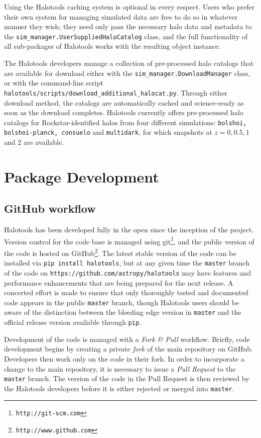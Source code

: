 \documentclass[usenatbib,usegraphicx,letterpaper]{mn2e}
\begin{document}
Using the Halotools caching system is optional in every respect. Users who prefer their own system for managing simulated data are free to do so in whatever manner they wish; they need only pass the necessary halo data and metadata to the {\tt sim\_manager.UserSuppliedHaloCatalog} class, and the full functionality of all sub-packages of Halotools works with the resulting object instance.  

The Halotools developers manage a collection of pre-processed halo catalogs that are available for download either with the {\tt sim\_manager.DownloadManager} class, or with the command-line script {\tt halotools/scripts/download\_additional\_halocat.py}. Through either download method, the catalogs are automatically cached and science-ready as soon as the download completes. Halotools currently offers pre-processed halo catalogs for Rockstar-identified halos from four different simulations: {\tt bolshoi, bolshoi-planck, consuelo} and {\tt multidark}, for which snapshots at $z=0, 0.5, 1$ and $2$ are available.


\section{Package Development}
\label{section:development}

\subsection{GitHub workflow}
\label{subsection:githubworkflow}

Halotools has been developed fully in the open since the inception of the project. Version control for the code base is managed using git\footnote{\tt http://git-scm.com}, and the public version of the code is hosted on GitHub\footnote{\tt http://www.github.com}. The latest stable version of the code can be installed via {\tt pip install halotools}, but at any given time the {\tt master} branch of the code on {\tt https://github.com/astropy/halotools} may have features and performance enhancements that are being prepared for the next release. A concerted effort is made to ensure that only thoroughly tested and documented code appears in the public {\tt master} branch, though Halotools users should be aware of the distinction between the bleeding edge version in {\tt master} and the official release version available through {\tt pip}. 

Development of the code is managed with a {\em Fork \& Pull} workflow. Briefly, code development begins by creating a private {\em fork} of the main repository on GitHub. Developers then work only on the code in their fork. In order to incorporate a change to the main repository, it is necessary to issue a {\em Pull Request} to the {\tt master} branch. The version of the code in the Pull Request is then reviewed by the Halotools developers before it is either rejected or merged into {\tt master}.
\end{document}
